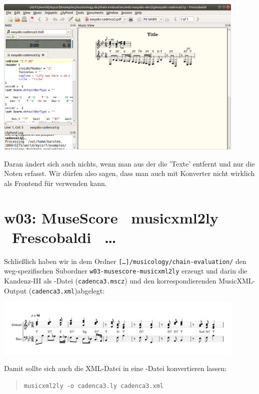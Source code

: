 \begin{center}
\includegraphics[width=0.9\textwidth]{frontends/easyabc/easyabc-cadenca3-in-frescobaldi.png}
\end{center}

Daran ändert sich auch nichts, wenn man aus der  die 'Texte'
entfernt und nur die Noten erfasst. Wir dürfen also sagen, dass man
 auch mit Konverter nicht wirklich als Frontend für 
verwenden kann.

\section{w03: Muse\-Score \ra\ musicxml2ly \ra\ Frescobaldi \ra\ \ldots}\label{w03}

Schließlich haben wir in dem Ordner
\texttt{[\ldots]/musicology/chain-evaluation/} den weg-spezifischen Subordner
\texttt{w03-musescore-musicxml2ly} erzeugt und darin die Kandenz-III als
-Datei (\texttt{cadenca3.mscz}) und den korrespondierenden
MusicXML-Output (\texttt{cadenca3.xml})abgelegt:

\begin{center}
\includegraphics[width=0.9\textwidth]{frontends/musescore/cadenca3-musescore-300dpi.png}
\end{center}

Damit sollte sich auch die XML-Datei in eine -Datei konvertieren lassen:

\begin{quote}\texttt{musicxml2ly -o cadenca3.ly cadenca3.xml}\end{quote}

